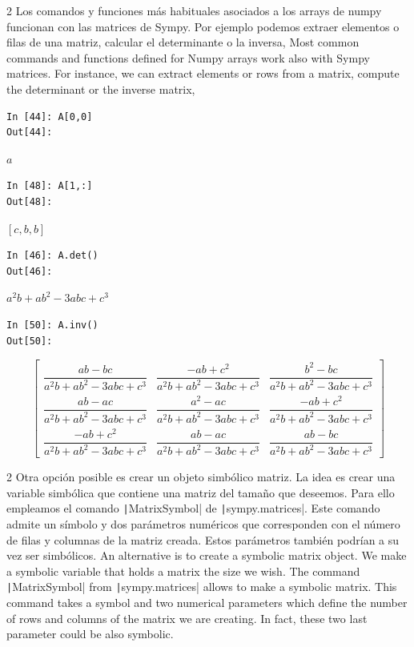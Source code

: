 \begin{paracol}{2}
Los comandos y funciones más habituales asociados a los arrays de numpy funcionan con las matrices de Sympy. Por ejemplo podemos extraer elementos o filas de una matriz, calcular el determinante o la inversa,
\switchcolumn
Most common commands and functions defined for Numpy arrays work also with Sympy matrices. For instance, we can extract elements or rows from a matrix, compute the determinant or the inverse matrix, 
\end{paracol}
\begin{center}
	\begin{minipage}{.5\textwidth}
		\begin{verbatim}
In [44]: A[0,0]
Out[44]: 
\end{verbatim}
$a$	 				
\begin{verbatim}
In [48]: A[1,:]
Out[48]:
\end{verbatim}
$[c,b,b]$
\begin{verbatim}
In [46]: A.det()
Out[46]: 
\end{verbatim}
$a^2b+ab^2-3abc+c^3$
\end{minipage}
\end{center}
\begin{center}
	\begin{minipage}{.5\textwidth}

\begin{verbatim}
In [50]: A.inv()
Out[50]: 
\end{verbatim}
	\end{minipage}
\end{center}
\[
\begin{bmatrix}
\dfrac{a b - b c}{a^{2} b + a b^{2} - 3 a b c + c^{3}} & \dfrac{- a b + c^{2}}{a^{2} b + a b^{2} - 3 a b c + c^{3}} & \dfrac{b^{2} - b c}{a^{2} b + a b^{2} - 3 a b c + c^{3}}\\[3ex]
\dfrac{a b - a c}{a^{2} b + a b^{2} - 3 a b c + c^{3}} & \dfrac{a^{2} - a c}{a^{2} b + a b^{2} - 3 a b c + c^{3}} & \dfrac{- a b + c^{2}}{a^{2} b + a b^{2} - 3 a b c + c^{3}}\\[3ex]
\dfrac{- a b + c^{2}}{a^{2} b + a b^{2} - 3 a b c + c^{3}} & \dfrac{a b - a c}{a^{2} b + a b^{2} - 3 a b c + c^{3}} & \dfrac{a b - b c}{a^{2} b + a b^{2} - 3 a b c + c^{3}}
\end{bmatrix}
\]
\begin{paracol}{2}
Otra opción posible es crear un objeto simbólico matriz. La idea es crear una variable simbólica que contiene una matriz del tamaño que deseemos. Para ello empleamos el comando \texttt|MatrixSymbol| de  \texttt|sympy.matrices|. Este comando admite un símbolo y dos parámetros numéricos que corresponden con el número de filas y columnas de la matriz creada. Estos parámetros también podrían a su vez ser simbólicos.
\switchcolumn
An alternative is to create a symbolic matrix object. We make a symbolic variable that holds a matrix the size we wish. The command \texttt|MatrixSymbol| from \texttt|sympy.matrices| allows to make a symbolic matrix. This command takes a symbol and two numerical parameters which define the number of rows and columns of the matrix we are creating. In fact, these two last parameter could be also symbolic.
\end{paracol}
